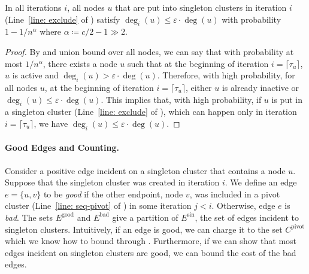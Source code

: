 \documentclass{theoretics}
\newcommand{\eps}{\ensuremath{\varepsilon}}
\newcommand{\ourcluster}{\ensuremath{C^{\textrm{pivot}}}\xspace}
\newcommand{\badedges}{\ensuremath{E^{\textrm{bad}}}\xspace}
\newcommand{\goodedges}{\ensuremath{E^{\textrm{good}}}\xspace}
\newcommand{\singletonedges}{\ensuremath{E^{\textrm{sin}}}\xspace}
\begin{document}
\begin{lemma} \label{lemma: singleton-cluster-deg-bound}
    In all iterations $i$, all nodes $u$ that are put into singleton clusters in iteration $i$ (Line~\ref{line: exclude} of ) satisfy $\deg_{i}(u) \le \eps \cdot \deg(u)$ with probability $1-1/n^{\alpha}$ where $\alpha \coloneqq c/2 - 1 \gg 2$.
\end{lemma}
\begin{proof}
By  and union bound over all nodes, we can say that with probability at most $1/n^\alpha$, there exists a node $u$ such that at the beginning of iteration $i = \lceil\tau_u\rceil$, $u$ is active and $\deg_{i}(u) > \eps \cdot \deg(u)$. Therefore, with high probability, for all nodes $u$, at the beginning of iteration $i = \lceil\tau_u\rceil$, either $u$ is already inactive or $\deg_{i}(u) \le \eps \cdot \deg(u)$. This implies that, with high probability, if $u$ is put in a singleton cluster (Line~\ref{line: exclude} of ), which can happen only in iteration $i = \lceil\tau_u\rceil$, we have $\deg_{i}(u) \le \eps \cdot \deg(u)$.
\end{proof}


\paragraph*{Good Edges and Counting.}
Consider a positive edge incident on a singleton cluster that contains a node $u$.
Suppose that the singleton cluster was created in iteration $i$.
We define an edge $e = \{u, v \}$ to be \emph{good} if the other endpoint, node $v$, was included in a pivot cluster (Line~\ref{line: seq-pivot} of ) in some iteration $j < i$.
Otherwise, edge $e$ is \emph{bad}. 
The sets $\goodedges$ and $\badedges$ give a partition of $\singletonedges$, the set of edges incident to singleton clusters. 
Intuitively, if an edge is good, we can charge it to the set $\ourcluster$ which we know how to bound through .
Furthermore, if we can show that most edges incident on singleton clusters are good, we can bound the cost of the bad edges.
\end{document}
